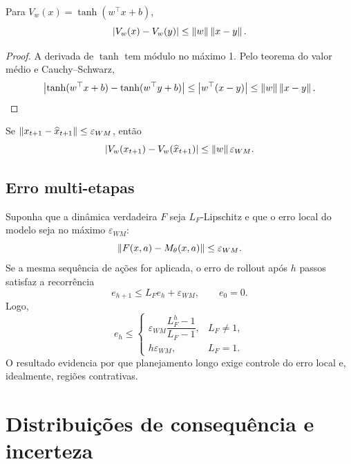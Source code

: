 \begin{lemma}
Para \(V_w(x)=\tanh(w^\top x+b)\),
\begin{equation}
\left\lvert V_w(x)-V_w(y) \right\rvert\le\left\lVert w \right\rVert\left\lVert x-y \right\rVert.
\label{eq:val_lip}
\end{equation}
\end{lemma}
\begin{proof}
A derivada de \(\tanh\) tem módulo no máximo 1. Pelo teorema do valor médio e Cauchy--Schwarz,
\[
\left\lvert \tanh(w^\top x+b)-\tanh(w^\top y+b) \right\rvert
\le\left\lvert w^\top(x-y) \right\rvert
\le\left\lVert w \right\rVert\left\lVert x-y \right\rVert.
\]
\end{proof}

\begin{corollary}
Se \(\left\lVert x_{t+1}-\widehat x_{t+1} \right\rVert\le\varepsilon_{WM}\), então
\begin{equation}
\left\lvert V_w(x_{t+1})-V_w(\widehat x_{t+1}) \right\rvert
\le\left\lVert w \right\rVert\varepsilon_{WM}.
\end{equation}
\end{corollary}

\subsection{Erro multi-etapas}

Suponha que a dinâmica verdadeira \(F\) seja \(L_F\)-Lipschitz e que o erro local do modelo seja no máximo \(\varepsilon_{WM}\):
\begin{equation}
\left\lVert F(x,a)-M_\theta(x,a) \right\rVert\le\varepsilon_{WM}.
\end{equation}
Se a mesma sequência de ações for aplicada, o erro de rollout após \(h\) passos satisfaz a recorrência
\begin{equation}
e_{h+1}\le L_Fe_h+\varepsilon_{WM},
\qquad e_0=0.
\end{equation}
Logo,
\begin{equation}
e_h\le
\begin{cases}
\varepsilon_{WM}\dfrac{L_F^h-1}{L_F-1}, & L_F\neq1,\\[3mm]
h\varepsilon_{WM}, & L_F=1.
\end{cases}
\label{eq:rollout_error}
\end{equation}
O resultado evidencia por que planejamento longo exige controle do erro local e, idealmente, regiões contrativas.

\section{Distribuições de consequência e incerteza}

